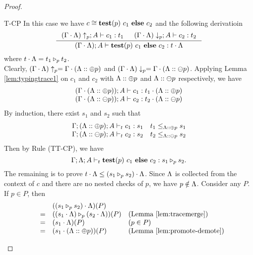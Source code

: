 {{{\begin{proof}
\begin{ProofEnumDesc}
\item[T-CP] In this case we have $c\cong \lcCP{p}{c_1}{c_2}$ and the following derivatioin
\begin{equation*}
\inference
{(\Gamma\cdot\trace)\uparrow_{p};  A \vdash c_1 : t_1 &
(\Gamma\cdot\trace)\downarrow_{p}; A \vdash c_2 : t_2}
{(\Gamma\cdot\trace);A\vdash \lcCP{p}{c_1}{c_2} : t\cdot \trace}
\end{equation*}
where $t\cdot \trace = \omerge{p}{t_1}{t_2}$.\\

Clearly,
$(\Gamma\cdot \trace)\uparrow_{p}= \Gamma\cdot (\trace::\tplus{p})$
and $(\Gamma\cdot \trace)\downarrow_{p}= \Gamma\cdot (\trace::\tminus{p})$.
Applying Lemma \ref{lem:typingtrace1} on $c_1$ and $c_2$ with $\trace::\tplus  {p}$ and $ \trace::\tminus{p}$ respectively, we have
\begin{equation*}
\begin{array}{l}
(\Gamma\cdot(\trace::\tplus  {p})); A \vdash c_1 : t_1\cdot(\trace::\tplus  {p})\\
(\Gamma\cdot (\trace::\tminus {p})); A \vdash c_2 : t_2\cdot(\trace::\tminus  {p})
\end{array}
\end{equation*}
By induction, there exist $s_1$ and $s_2$ such that
\begin{equation*}
\begin{array}{l}
\Gamma; (\trace :: \tplus {p});  A \vdash_{t} c_1 : s_1\quad
t_1 \leq_{\trace::\tplus p} s_1 \\
\Gamma; (\trace:: \tminus {p});  A \vdash_{t} c_2 : s_2\quad
t_2 \leq_{\trace::\tminus p} s_2
\end{array}
\end{equation*}
Then by Rule {(TT-CP)}, we have
$$
\Gamma;\trace;A\vdash_{t} \lcCP{p}{c_1}{c_2} : \omerge{p}{s_1}{s_2}.
$$
The remaining is to prove $t\cdot\trace \leq (\omerge{p}{s_1}{s_2})\cdot\trace$.
Since $\trace$ is collected from the context of $c$ and there are no nested checks of $p$, we have $p \notin \trace$.
Consider any $P$. If $p \in P$, then
$$
\begin{array}{rlll}
&&((\omerge{p}{s_1}{s_2})\cdot\trace)(P) &\\
&=&(\omerge{p}{(s_1\cdot\trace)}{(s_2\cdot\trace)})(P) &(\textrm{Lemma \ref{lem:tracemerge}})\\
&=&(s_1\cdot\trace)(P) & (p\in P)\\
&=&(s_1\cdot(\trace::\tplus{p}))(P) & (\textrm{Lemma \ref{lem:promote-demote}})\\

\end{array}$$
\end{ProofEnumDesc}
\end{proof}}}}
